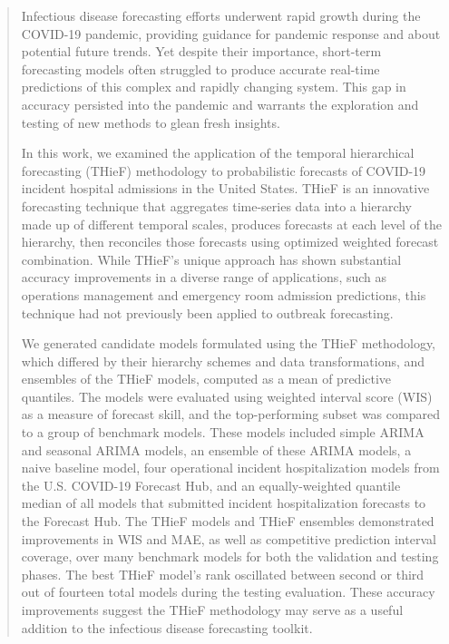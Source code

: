\documentclass[12pt]{article}
\begin{document}
\begin{abstract}                %
Infectious disease forecasting efforts underwent rapid growth during the COVID-19 pandemic, providing guidance for pandemic response and about potential future trends. Yet despite their importance, short-term forecasting models often struggled to produce accurate real-time predictions of this complex and rapidly changing system. This gap in accuracy persisted into the pandemic and warrants the exploration and testing of new methods to glean fresh insights.

In this work, we examined the application of the temporal hierarchical forecasting (THieF) methodology to probabilistic forecasts of COVID-19 incident hospital admissions in the United States. THieF is an innovative forecasting technique that aggregates time-series data into a hierarchy made up of different temporal scales, produces forecasts at each level of the hierarchy, then reconciles those forecasts using optimized weighted forecast combination. While THieF's unique approach has shown substantial accuracy improvements in a diverse range of applications, such as operations management and emergency room admission predictions, this technique had not previously been applied to outbreak forecasting.

We generated candidate models formulated using the THieF methodology, which differed by their hierarchy schemes and data transformations, and ensembles of the THieF models, computed as a mean of predictive quantiles. The models were evaluated using weighted interval score (WIS) as a measure of forecast skill, and the top-performing subset was compared to a group of benchmark models. These models included simple ARIMA and seasonal ARIMA models, an ensemble of these ARIMA models, a naive baseline model, four operational incident hospitalization models from the U.S. COVID-19 Forecast Hub, and an equally-weighted quantile median of all models that submitted incident hospitalization forecasts to the Forecast Hub. The THieF models and THieF ensembles demonstrated improvements in WIS and MAE, as well as competitive prediction interval coverage, over many benchmark models for both the validation and testing phases. The best THieF model's rank oscillated between second or third out of fourteen total models during the testing evaluation. These accuracy improvements suggest the THieF methodology may serve as a useful addition to the infectious disease forecasting toolkit.
\end{abstract}
\end{document}

